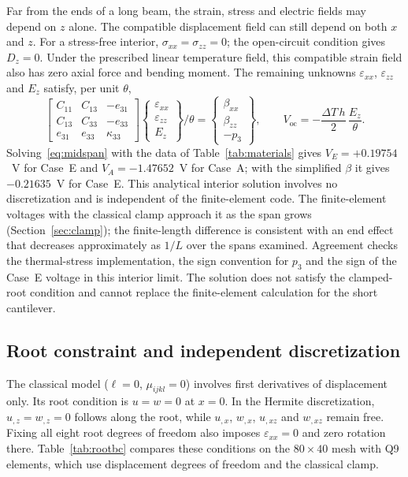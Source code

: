\documentclass[a4paper,12pt]{elsarticle}
\begin{document}
Far from the ends of a long beam, the strain, stress and electric
fields may depend on $z$ alone. The compatible displacement field
can still depend on both $x$ and $z$. For a stress-free interior,
$\sigma_{xx}=\sigma_{zz}=0$; the open-circuit condition gives
$D_z=0$. Under the prescribed linear temperature field, this
compatible strain field also has zero axial force and bending
moment. The remaining unknowns $\varepsilon_{xx}$,
$\varepsilon_{zz}$ and $E_z$ satisfy, per unit $\theta$,
\begin{equation}
\begin{bmatrix}C_{11}&C_{13}&-e_{31}\\ C_{13}&C_{33}&-e_{33}\\ e_{31}&e_{33}&\kappa_{33}\end{bmatrix}
\begin{Bmatrix}\varepsilon_{xx}\\ \varepsilon_{zz}\\ E_z\end{Bmatrix}/\theta
=\begin{Bmatrix}\beta_{xx}\\ \beta_{zz}\\ -p_3\end{Bmatrix},
\qquad
V_{\mathrm{oc}}=-\frac{\Delta T\,h}{2}\,\frac{E_z}{\theta}.
\label{eq:midspan}
\end{equation}
Solving~\eqref{eq:midspan} with the data of Table~\ref{tab:materials} gives $V_E=+0.19754$~V for Case~E and $V_A=-1.47652$~V for Case~A; with the simplified $\beta$ it gives $-0.21635$~V for Case~E. This analytical interior solution involves no discretization and is independent of the finite-element code. The finite-element voltages with the classical clamp approach it as the span grows (Section~\ref{sec:clamp}); the finite-length difference is consistent with an end effect that decreases approximately as $1/L$ over the spans examined. Agreement checks the thermal-stress implementation, the sign convention for $p_3$ and the sign of the Case~E voltage in this interior limit. The solution does not satisfy the clamped-root condition and cannot replace the finite-element calculation for the short cantilever.

\subsection{Root constraint and independent discretization}
\label{sec:rootbc}

The classical model ($\ell=0$, $\mu_{ijkl}=0$) involves first
derivatives of displacement only. Its root condition is $u=w=0$
at $x=0$. In the Hermite discretization, $u_{,z}=w_{,z}=0$
follows along the root, while $u_{,x}$, $w_{,x}$, $u_{,xz}$
and $w_{,xz}$ remain free. Fixing all eight root degrees of freedom
also imposes $\varepsilon_{xx}=0$ and zero rotation there.
Table~\ref{tab:rootbc} compares these conditions on the
$80\times40$ mesh with Q9 elements, which use displacement
degrees of freedom and the classical clamp.
\end{document}
